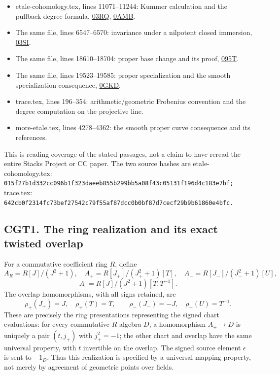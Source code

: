 \begin{itemize}
\tightlist
\item
  etale-cohomology.tex, lines 11071--11244: Kummer calculation and the
  pullback degree formula,
  \href{https://stacks.math.columbia.edu/tag/03RQ}{03RQ},
  \href{https://stacks.math.columbia.edu/tag/0AMB}{0AMB}.
\item
  The same file, lines 6547--6570: invariance under a nilpotent closed
  immersion, \href{https://stacks.math.columbia.edu/tag/03SI}{03SI}.
\item
  The same file, lines 18610--18704: proper base change and its proof,
  \href{https://stacks.math.columbia.edu/tag/095T}{095T}.
\item
  The same file, lines 19523--19585: proper specialization and the
  smooth specialization consequence,
  \href{https://stacks.math.columbia.edu/tag/0GKD}{0GKD}.
\item
  trace.tex, lines 196--354: arithmetic/geometric Frobenius convention
  and the degree computation on the projective line.
\item
  more-etale.tex, lines 4278--4362: the smooth proper curve consequence
  and its references.
\end{itemize}

This is reading coverage of the stated passages, not a claim to have
reread the entire Stacks Project or CC paper. The two source hashes are
etale-cohomology.tex:
\nolinkurl{015f27b1d332cc096b1f323daeeb855b299bb5a08f43c05131f196d4c183e7bf;}
trace.tex:
\nolinkurl{642cb0f2314fc73bef27542c79f55af87dcc0b0bf87d7cecf29b9b61860e4bfc.}

\subsection{CGT1. The ring realization and its exact twisted
overlap}\label{cgt1.-the-ring-realization-and-its-exact-twisted-overlap}

For a commutative coefficient ring \(R\), define \[
A_R=R[J]/(J^2+1),\quad
A_+=R[J_+]/(J_+^2+1)[T],\quad
A_-=R[J_-]/(J_-^2+1)[U],
\] \[
A_\circ=R[J]/(J^2+1)[T,T^{-1}].
\tag{CGT1.1}
\] The overlap homomorphisms, with all signs retained, are \[
\rho_+(J_+)=J,\quad \rho_+(T)=T,\qquad
\rho_-(J_-)=-J,\quad \rho_-(U)=T^{-1}.
\tag{CGT1.2}
\] These are precisely the ring presentations representing the signed
chart evaluations: for every commutative \(R\)-algebra \(D\), a
homomorphism \(A_+\to D\) is uniquely a pair \((t,j_+)\) with
\(j_+^2=-1\); the other chart and overlap have the same universal
property, with \(t\) invertible on the overlap. The signed source
element \(\epsilon\) is sent to \(-1_D\). Thus this realization is
specified by a universal mapping property, not merely by agreement of
geometric points over fields.

